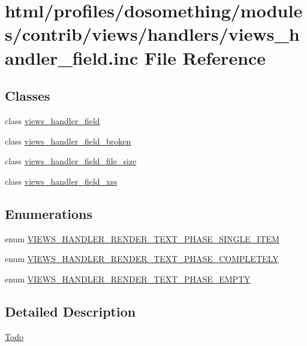 \hypertarget{views__handler__field_8inc}{
\section{html/profiles/dosomething/modules/contrib/views/handlers/views\_\-handler\_\-field.inc File Reference}
\label{views__handler__field_8inc}
}
\subsection*{Classes}
\begin{DoxyCompactItemize}
\item 
class \hyperlink{classviews__handler__field}{views\_\-handler\_\-field}
\item 
class \hyperlink{classviews__handler__field__broken}{views\_\-handler\_\-field\_\-broken}
\item 
class \hyperlink{classviews__handler__field__file__size}{views\_\-handler\_\-field\_\-file\_\-size}
\item 
class \hyperlink{classviews__handler__field__xss}{views\_\-handler\_\-field\_\-xss}
\end{DoxyCompactItemize}
\subsection*{Enumerations}
\begin{DoxyCompactItemize}
\item 
enum \hyperlink{group__views__field__handlers_gaa1014f79648c5c78750110efa0437397}{VIEWS\_\-HANDLER\_\-RENDER\_\-TEXT\_\-PHASE\_\-SINGLE\_\-ITEM} 
\item 
enum \hyperlink{group__views__field__handlers_ga9e79d8dea50ce8dff131afa22ecfac41}{VIEWS\_\-HANDLER\_\-RENDER\_\-TEXT\_\-PHASE\_\-COMPLETELY} 
\item 
enum \hyperlink{group__views__field__handlers_ga0a388e031abd2ce00c90925a940235c9}{VIEWS\_\-HANDLER\_\-RENDER\_\-TEXT\_\-PHASE\_\-EMPTY} 
\end{DoxyCompactItemize}


\subsection{Detailed Description}
\begin{Desc}
\item[\hyperlink{todo__todo000045}{Todo}]\end{Desc}
